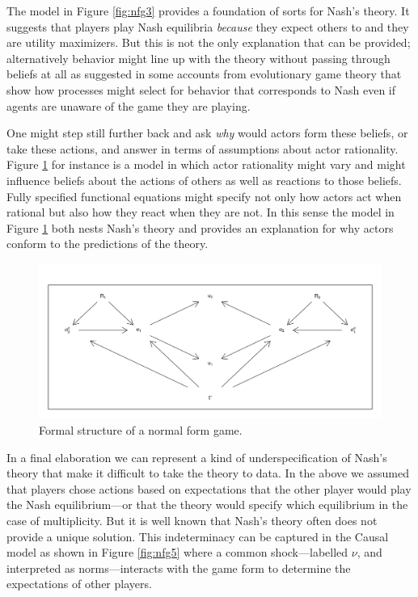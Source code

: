 \documentclass[
  12pt,
]{book}
\begin{document}
The model in Figure \ref{fig:nfg3} provides a foundation of sorts for Nash's theory. It suggests that players play Nash equilibria \emph{because} they expect others to and they are utility maximizers. But this is not the only explanation that can be provided; alternatively behavior might line up with the theory without passing through beliefs at all as suggested in some accounts from evolutionary game theory that show how processes might select for behavior that corresponds to Nash even if agents are unaware of the game they are playing.

One might step still further back and ask \emph{why} would actors form these beliefs, or take these actions, and answer in terms of assumptions about actor rationality. Figure \ref{fig:nfg4} for instance is a model in which actor rationality might vary and might influence beliefs about the actions of others as well as reactions to those beliefs. Fully specified functional equations might specify not only how actors act when rational but also how they react when they are not. In this sense the model in Figure \ref{fig:nfg4} both nests Nash's theory and provides an explanation for why actors conform to the predictions of the theory.

\begin{figure}

{\centering \includegraphics[width=0.8\linewidth]{ii_files/figure-latex/nfg4-1} 

}

\caption{Formal structure of a normal form game.}\label{fig:nfg4}
\end{figure}

In a final elaboration we can represent a kind of underspecification of Nash's theory that make it difficult to take the theory to data. In the above we assumed that players chose actions based on expectations that the other player would play the Nash equilibrium---or that the theory would specify which equilibrium in the case of multiplicity. But it is well known that Nash's theory often does not provide a unique solution. This indeterminacy can be captured in the Causal model as shown in Figure \ref{fig:nfg5} where a common shock---labelled \(\nu\), and interpreted as norms---interacts with the game form to determine the expectations of other players.
\end{document}
